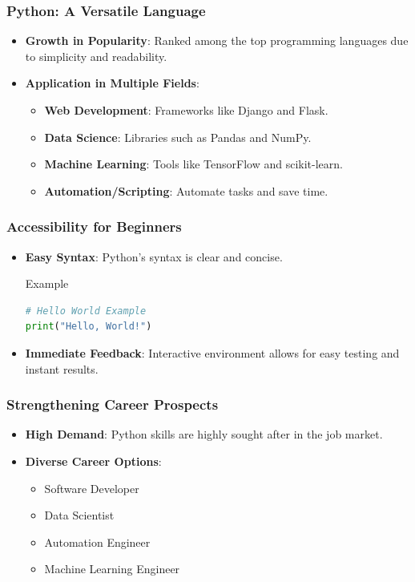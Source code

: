 \documentclass{beamer}
\begin{document}
\begin{frame}[fragile]
    \frametitle{Python: A Versatile Language}
    \begin{itemize}
        \item \textbf{Growth in Popularity}: Ranked among the top programming languages due to simplicity and readability.
        \item \textbf{Application in Multiple Fields}:
        \begin{itemize}
            \item \textbf{Web Development}: Frameworks like Django and Flask.
            \item \textbf{Data Science}: Libraries such as Pandas and NumPy.
            \item \textbf{Machine Learning}: Tools like TensorFlow and scikit-learn.
            \item \textbf{Automation/Scripting}: Automate tasks and save time.
        \end{itemize}
    \end{itemize}
\end{frame}

\begin{frame}[fragile]
    \frametitle{Accessibility for Beginners}
    \begin{itemize}
        \item \textbf{Easy Syntax}: Python’s syntax is clear and concise.
        \begin{block}{Example}
            \begin{lstlisting}[language=Python]
# Hello World Example
print("Hello, World!")
            \end{lstlisting}
        \end{block}
        \item \textbf{Immediate Feedback}: Interactive environment allows for easy testing and instant results.
    \end{itemize}
\end{frame}

\begin{frame}[fragile]
    \frametitle{Strengthening Career Prospects}
    \begin{itemize}
        \item \textbf{High Demand}: Python skills are highly sought after in the job market.
        \item \textbf{Diverse Career Options}:
        \begin{itemize}
            \item Software Developer
            \item Data Scientist
            \item Automation Engineer
            \item Machine Learning Engineer
        \end{itemize}
    \end{itemize}
\end{frame}
\end{document}
